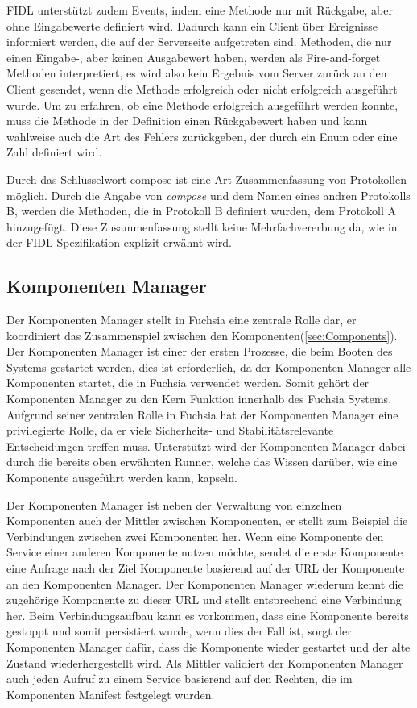 \documentclass[a4paper]{scrartcl}
\begin{document}
FIDL unterstützt zudem Events, indem eine Methode nur mit Rückgabe, aber ohne Eingabewerte definiert wird. Dadurch kann ein Client über Ereignisse informiert werden, die auf der Serverseite aufgetreten sind. Methoden, die nur einen Eingabe-, aber keinen Ausgabewert haben, werden als Fire-and-forget Methoden interpretiert, es wird also kein Ergebnis vom Server zurück an den Client gesendet, wenn die Methode erfolgreich oder nicht erfolgreich ausgeführt wurde. Um zu erfahren, ob eine Methode erfolgreich ausgeführt werden konnte, muss die Methode in der Definition einen Rückgabewert haben und kann wahlweise auch die Art des Fehlers zurückgeben, der durch ein Enum oder eine Zahl definiert wird. \cite{Fuchsia.FIDL.Specitifcation}

Durch das Schlüsselwort compose ist eine Art Zusammenfassung von Protokollen möglich. Durch die Angabe von \textit{compose} und dem Namen eines andren Protokolls B, werden die Methoden, die in Protokoll B definiert wurden, dem Protokoll A hinzugefügt. Diese Zusammenfassung stellt keine Mehrfachvererbung da, wie in der FIDL Spezifikation explizit erwähnt wird. \cite{Fuchsia.FIDL.Specitifcation}
\subsection{Komponenten Manager}
Der Komponenten Manager stellt in Fuchsia eine zentrale Rolle dar, er koordiniert das Zusammenspiel zwischen den Komponenten(\ref{sec:Components}). Der Komponenten Manager ist einer der ersten Prozesse, die beim Booten des Systems gestartet werden, dies ist erforderlich, da der Komponenten Manager alle Komponenten startet, die in Fuchsia verwendet werden. Somit gehört der Komponenten Manager zu den Kern Funktion innerhalb des Fuchsia Systems. Aufgrund seiner zentralen Rolle in Fuchsia hat der Komponenten Manager eine privilegierte Rolle, da er viele Sicherheits- und Stabilitätsrelevante Entscheidungen treffen muss. Unterstützt wird der Komponenten Manager dabei durch die bereits oben erwähnten Runner, welche das Wissen darüber, wie eine Komponente ausgeführt werden kann, kapseln.

Der Komponenten Manager ist neben der Verwaltung von einzelnen Komponenten auch der Mittler zwischen Komponenten, er stellt zum Beispiel die Verbindungen zwischen zwei Komponenten her. Wenn eine Komponente den Service einer anderen Komponente nutzen möchte, sendet die erste Komponente eine Anfrage nach der Ziel Komponente basierend auf der URL der Komponente an den Komponenten Manager. Der Komponenten Manager wiederum kennt die zugehörige Komponente zu dieser URL und stellt entsprechend eine Verbindung her. Beim Verbindungsaufbau kann es vorkommen, dass eine Komponente bereits gestoppt und somit persistiert wurde, wenn dies der Fall ist, sorgt der Komponenten Manager dafür, dass die Komponente wieder gestartet und der alte Zustand wiederhergestellt wird. Als Mittler validiert der Komponenten Manager auch jeden Aufruf zu einem Service basierend auf den Rechten, die im Komponenten Manifest festgelegt wurden. \cite{Fuchsia.Component.Lifecycle}\cite{Fuchsia.Component.Topology}
\end{document}
